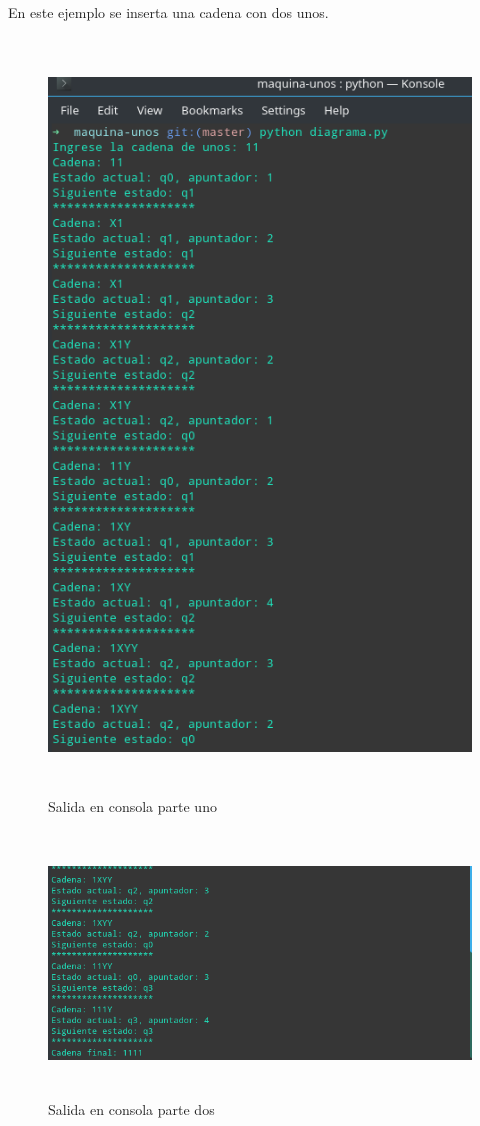\documentclass[a4paper,12pt]{article}
\begin{document}
En este ejemplo se inserta una cadena con dos unos.
\begin{figure}[H]
\begin{center}
 \includegraphics[width=13cm, height=20cm]{dos_consola.png}
 \caption{Salida en consola parte uno}
 \label{fig:dos_consola}
\end{center}
\end{figure}

\begin{figure}[H]
\begin{center}
 \includegraphics[width=13cm, height=7cm]{dos_console.png}
 \caption{Salida en consola parte dos}
 \label{fig:dos_console}
\end{center}
\end{figure}
\end{document}
